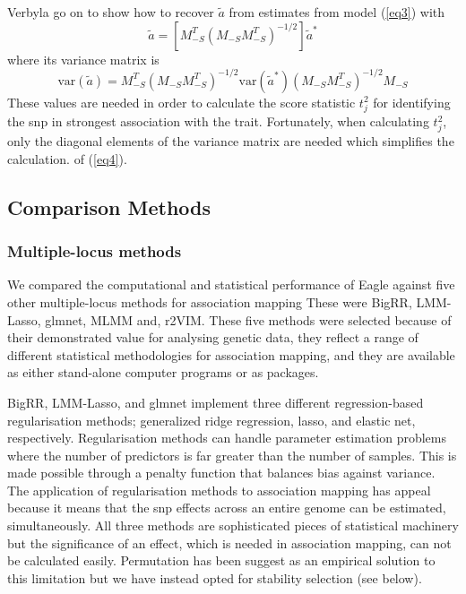 \documentclass{nature}
\begin{document}
Verbyla \cite{verbyla2012rwgaim,verbyla2014whole} go on to show how to recover $\widetilde{a}$ from estimates from model  (\ref{eq3})  with 
\begin{equation}
\widetilde{a} = \left [ M_{-S}^T (M_{-S} M_{-S}^T)^{-1/2} \right ] \widetilde{a}^*
\end{equation}
where its variance matrix is
\begin{equation}
\label{eq4}
\textrm{var}(\widetilde{a}) = M_{-S}^T (M_{-S} M_{-S}^T)^{-1/2} \textrm{var}(\widetilde{a}^*) (M_{-S} M_{-S}^T)^{-1/2} M_{-S}
\end{equation}
These values are needed in order to calculate the score statistic $t_j^2$ for identifying the snp in strongest association with the trait. 
Fortunately, when calculating $t_j^2$, only the diagonal elements of the variance matrix are needed which simplifies the  calculation. 
of (\ref{eq4}). 



\subsection{Comparison Methods}

\subsubsection{Multiple-locus methods}

We compared the computational and statistical performance of Eagle against five other multiple-locus methods for 
association mapping  These were BigRR, LMM-Lasso, glmnet, MLMM  and, r2VIM. 
These five methods were selected because of their demonstrated value 
for analysing genetic data, they reflect a range of different statistical methodologies for association mapping, and they are available as 
either stand-alone computer programs or as  packages.

BigRR, LMM-Lasso, and glmnet  implement three different regression-based regularisation methods; generalized ridge regression, 
lasso, and elastic net, respectively. Regularisation methods can handle parameter estimation problems where the number of predictors is
 far greater than the number of  samples. This is made possible through a penalty function that balances bias against variance. 
The application of regularisation methods to association mapping has appeal because it means that the snp effects across an 
entire genome can be estimated, simultaneously. 
All three methods are sophisticated pieces of statistical machinery but the significance of an effect, which 
is needed in association mapping,  can not be calculated easily. Permutation has been suggest as an empirical solution to this 
limitation \cite{shen2013novel} 
but we have instead opted for stability selection (see below).
\end{document}
